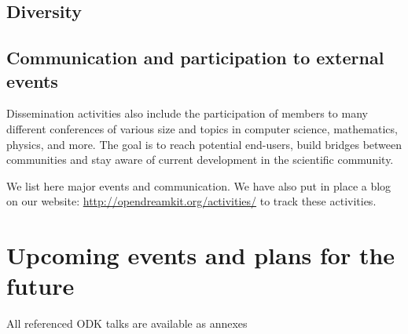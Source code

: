 \documentclass{deliverablereport}
\begin{document}




\subsection{Diversity}







\subsection{Communication and participation to external events}

Dissemination activities also include the participation of \ODK
members to many different conferences of various size and topics
in computer science, mathematics, physics, and more. The goal is
to reach potential end-users, build bridges between communities and stay aware 
of current development in the scientific community.

We list here major events and communication. We have also put in place
a blog on our website: \url{http://opendreamkit.org/activities/} to track
these activities.




















\section{Upcoming events and plans for the future}


\newpage\printbibliography

{\footnotesize All referenced ODK talks are available as annexes}
\end{document}
